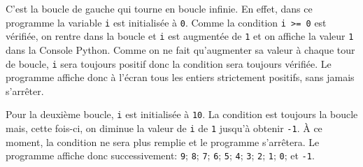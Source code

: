 \begin{correction}
	C'est la boucle de gauche qui tourne en boucle infinie. En effet, dans ce programme la variable \texttt{i} est initialisée à \texttt{0}. Comme la condition \texttt{i >= 0} est vérifiée, on rentre dans la boucle et \texttt{i} est augmentée de \texttt{1} et on affiche la valeur \texttt{1} dans la Console Python. Comme on ne fait qu'augmenter sa valeur à chaque tour de boucle, \texttt{i} sera toujours positif donc la condition sera toujours vérifiée. Le programme affiche donc à l'écran tous les entiers strictement positifs, sans jamais s'arrêter.
	
	Pour la deuxième boucle, \texttt{i} est initialisée à \texttt{10}. La condition est toujours la boucle mais, cette fois-ci, on diminue la valeur de \texttt{i} de \texttt{1} jusqu'à obtenir \texttt{-1}. À ce moment, la condition ne sera plus remplie et le programme s'arrêtera. Le programme affiche donc successivement: \texttt{9}; \texttt{8}; \texttt{7}; \texttt{6}; \texttt{5}; \texttt{4}; \texttt{3}; \texttt{2}; \texttt{1}; \texttt{0}; et \texttt{-1}. 
\end{correction}

